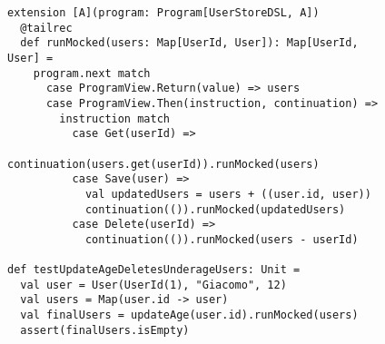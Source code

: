 \begin{figure}
  \begin{lstlisting}[language=scala3, label={lst:mock-free}, caption={Esempio di un interprete di test per un programma che usa lo \lstinline{UserStoreDSL}. In questo caso l'uso di una mappa degli utenti permette di testare semplicemente la logica applicativa delle operazioni senza dover ricorrere a un vero e proprio database}]
extension [A](program: Program[UserStoreDSL, A])
  @tailrec
  def runMocked(users: Map[UserId, User]): Map[UserId, User] =
    program.next match
      case ProgramView.Return(value) => users
      case ProgramView.Then(instruction, continuation) =>
        instruction match
          case Get(userId) =>
            continuation(users.get(userId)).runMocked(users)
          case Save(user) =>
            val updatedUsers = users + ((user.id, user))
            continuation(()).runMocked(updatedUsers)
          case Delete(userId) =>
            continuation(()).runMocked(users - userId)

def testUpdateAgeDeletesUnderageUsers: Unit =
  val user = User(UserId(1), "Giacomo", 12)
  val users = Map(user.id -> user)
  val finalUsers = updateAge(user.id).runMocked(users)
  assert(finalUsers.isEmpty)
  \end{lstlisting}
\end{figure}
